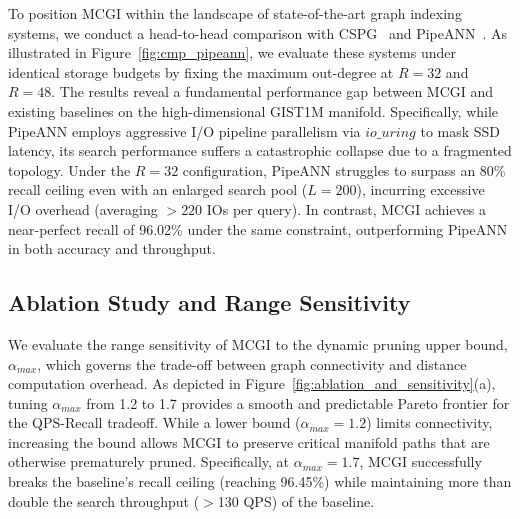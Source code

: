 \documentclass{article}
\theoremstyle{plain}
\theoremstyle{definition}
\theoremstyle{remark}
\newcommand{\ours}{MCGI\xspace}
\begin{document}
To position \ours{} within the landscape of state-of-the-art graph indexing systems, we conduct a head-to-head comparison with CSPG~\cite{NEURIPS2024_bab1486c} and PipeANN~\cite{osdi25pipeann, fast26odinann}. As illustrated in Figure~\ref{fig:cmp_pipeann}, we evaluate these systems under identical storage budgets by fixing the maximum out-degree at $R=32$ and $R=48$. 
The results reveal a fundamental performance gap between \ours{} and existing baselines on the high-dimensional GIST1M manifold. Specifically, while PipeANN employs aggressive I/O pipeline parallelism via $io\_uring$ to mask SSD latency, its search performance suffers a catastrophic collapse due to a fragmented topology. Under the $R=32$ configuration, PipeANN struggles to surpass an 80\% recall ceiling even with an enlarged search pool ($L=200$), incurring excessive I/O overhead (averaging $>220$ IOs per query). In contrast, \ours{} achieves a near-perfect recall of 96.02\% under the same constraint, outperforming PipeANN in both accuracy and throughput. 





\subsection{Ablation Study and Range Sensitivity}
\label{subsec:parameter_sensitivity}

We evaluate the range sensitivity of MCGI to the dynamic pruning upper bound, $\alpha_{max}$, which governs the trade-off between graph connectivity and distance computation overhead. As depicted in Figure~\ref{fig:ablation_and_sensitivity}(a), tuning $\alpha_{max}$ from 1.2 to 1.7 provides a smooth and predictable Pareto frontier for the QPS-Recall tradeoff. While a lower bound ($\alpha_{max} = 1.2$) limits connectivity, increasing the bound allows MCGI to preserve critical manifold paths that are otherwise prematurely pruned. Specifically, at $\alpha_{max} = 1.7$, MCGI successfully breaks the baseline's recall ceiling (reaching 96.45\%) while maintaining more than double the search throughput ($>$130 QPS) of the baseline. 
\end{document}
